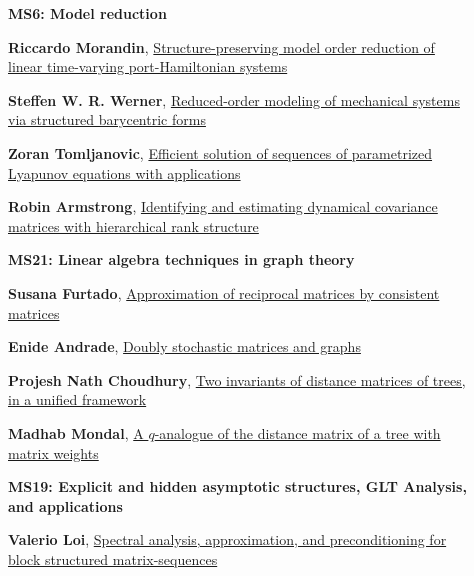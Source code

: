 \documentclass[ILAS2025-program.tex]{subfiles}
\begin{document}
\begin{description}
\begin{description}
    \item[] {\color{mstitle}\textbf{MS6: Model reduction}} 
    \item[] \hypertarget{up0165}{}\textbf{Riccardo Morandin}, \hyperlink{down0165}{Structure-preserving model order reduction of linear time-varying port-Hamiltonian systems}
        \item[] \hypertarget{up0166}{}\textbf{Steffen W. R. Werner}, \hyperlink{down0166}{Reduced-order modeling of mechanical systems via structured barycentric forms}
        \item[] \hypertarget{up0167}{}\textbf{Zoran Tomljanovic}, \hyperlink{down0167}{Efficient solution of sequences of parametrized Lyapunov equations with applications}
        \item[] \hypertarget{up0168}{}\textbf{Robin Armstrong}, \hyperlink{down0168}{Identifying and estimating dynamical covariance matrices with hierarchical rank structure}
        \end{description}
    \begin{description}
    \item[] {\color{mstitle}\textbf{MS21: Linear algebra techniques in graph theory}} 
    \item[] \hypertarget{up0169}{}\textbf{Susana Furtado}, \hyperlink{down0169}{Approximation of reciprocal matrices by consistent matrices}
        \item[] \hypertarget{up0170}{}\textbf{Enide Andrade}, \hyperlink{down0170}{Doubly stochastic matrices and graphs}
        \item[] \hypertarget{up0171}{}\textbf{Projesh Nath Choudhury}, \hyperlink{down0171}{Two invariants of distance matrices of trees, in a unified framework}
        \item[] \hypertarget{up0172}{}\textbf{Madhab Mondal}, \hyperlink{down0172}{A $q$-analogue of the distance matrix of a tree with matrix weights}
        \end{description}
    \begin{description}
    \item[] {\color{mstitle}\textbf{MS19: Explicit and hidden asymptotic structures, GLT Analysis, and applications}} 
    \item[] \hypertarget{up0173}{}\textbf{Valerio Loi}, \hyperlink{down0173}{Spectral analysis, approximation, and preconditioning for block structured matrix-sequences}

\end{description}
\end{description}
\end{document}

